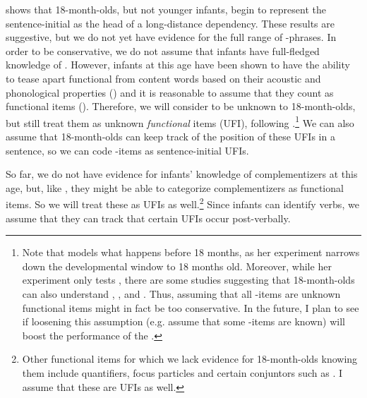  \textcite{perkinslidz2021wh} shows that 18-month-olds, but not younger infants, begin to represent the sentence-initial  as the head of a long-distance dependency. These results are suggestive, but we do not yet have evidence for the full range of \twh-phrases. In order to be conservative, we do not assume that infants have full-fledged knowledge of \twh{}. However, infants at this age have been shown to have the ability to tease apart functional from content words based on their acoustic and phonological properties (\cite{shi1999func,shi2014functional}) and it is reasonable to assume that they count  as functional items (\cite{perkins2019}). Therefore, we will consider \twh{} to be unknown to 18-month-olds, but still treat them as unknown \emph{functional} items (UFI), following \textcite{perkins2019}.\footnote{Note that \textcite{perkins2019} models what happens before 18 months, as her experiment narrows down the developmental window to 18 months old. Moreover, while her experiment only tests , there are some studies suggesting that 18-month-olds can also understand , , and . Thus, assuming that all \twh-items are unknown functional items might in fact be too conservative. In the future, I plan to see if loosening this assumption (e.g. assume that some \twh-items are known) will boost the performance of the \dlearnerabbr{}.} We can also assume that 18-month-olds can keep track of the position of these UFIs in a sentence, so we can code \twh-items as sentence-initial UFIs. 

 So far, we do not have evidence for infants' knowledge of complementizers at this age, but, like , they might be able to categorize complementizers as functional items. So we will treat these as UFIs as well.\footnote{Other functional items for which we lack evidence for 18-month-olds knowing them include quantifiers, focus particles and certain conjuntors such as . I assume that these are UFIs as well.} Since infants can identify verbs, we assume that they can track that certain UFIs occur post-verbally. 





